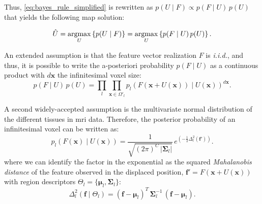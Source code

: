 Thus, \eqref{eq:bayes_rule_simplified} is rewritten as 
$p(U \mid F) \propto p(F \mid U)\, p(U)$ that yields the
following \gls{map} solution:

\begin{equation}
\hat{U} = \underset{U}{\argmax} \left\{ p(U \mid F) \right\} = 
\underset{U}{\argmax} \left\{ p(F \mid U)\, p(U) \right\}.
\label{eq:map_u}
\end{equation}


An extended assumption is that the feature vector realization $F$ is
\emph{i.i.d.}, and thus, it is possible to write the a-posteriori
probability $p(F \mid U)$ as a continuous product with $d\mathbf{x}$ the
infinitesimal voxel size:
\begin{equation}
p(F \mid U) \, p(U) = \underset{l}{\prod} \underset{\mathbf{x}\in \Omega'_l}{\prod}
p_l\left( F(\mathbf{x} + U(\mathbf{x})) \mid U(\mathbf{x}) \right)^{d\mathbf{x}}.
\label{eq:bayes_aposteriori}
\end{equation}

A second widely-accepted assumption is the multivariate normal 
distribution of the different tissues in \gls{mri} data. Therefore,
the posterior probability of an infinitesimal voxel can be written as:
\begin{equation}
p_l( F(\mathbf{x}) \mid U(\mathbf{x}) ) = \frac{1}{ \sqrt{(2\pi)^{C}\,\left|\boldsymbol{\Sigma}_{l}\right|}}\,{e^{\left(-\frac{1}{2}  \Delta^2_l (\mathbf{f}') \right)}}.
\label{eq:bayes_mpdf}
\end{equation}
where we can identify the factor in the exponential as the squared \emph{Mahalanobis 
distance} of the feature observed in the displaced position, $\mathbf{f}' = 
F(\mathbf{x} + U(\mathbf{x}))$ with region descriptors
$\Theta_l = \lbrace \boldsymbol{\mu}_l, \boldsymbol{\Sigma}_l \rbrace$:
\begin{equation}
\Delta^2_l (\mathbf{f} \mid \Theta_l ) = (\mathbf{f} - \boldsymbol{\mu}_l)^T \, \boldsymbol{\Sigma}^{-1}_l \, (\mathbf{f} - \boldsymbol{\mu}_l).
\label{eq:bayes_mahalanobis}
\end{equation}

